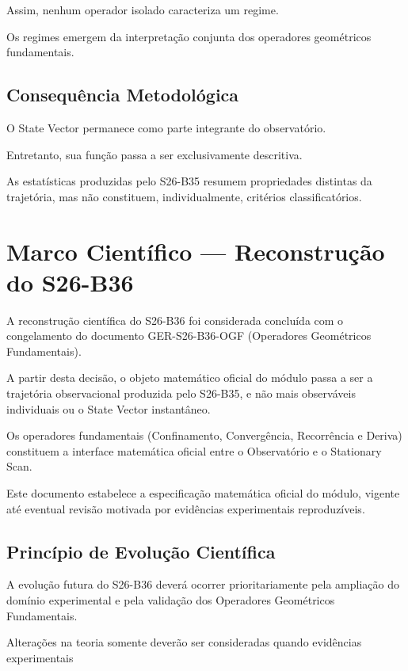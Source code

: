 \documentclass[11pt,a4paper]{article}
\begin{document}
Assim, nenhum operador isolado caracteriza um regime.

Os regimes emergem da interpretação conjunta dos operadores geométricos fundamentais.

\subsection{Consequência Metodológica}

O State Vector permanece como parte integrante do observatório.

Entretanto, sua função passa a ser exclusivamente descritiva.

As estatísticas produzidas pelo S26-B35 resumem propriedades distintas da trajetória, mas
não constituem, individualmente, critérios classificatórios.

\section{Marco Científico --- Reconstrução do S26-B36}

A reconstrução científica do S26-B36 foi considerada concluída com o congelamento do
documento GER-S26-B36-OGF (Operadores Geométricos Fundamentais).

A partir desta decisão, o objeto matemático oficial do módulo passa a ser a trajetória
observacional produzida pelo S26-B35, e não mais observáveis individuais ou o State
Vector instantâneo.

Os operadores fundamentais (Confinamento, Convergência, Recorrência e Deriva)
constituem a interface matemática oficial entre o Observatório e o Stationary Scan.

Este documento estabelece a especificação matemática oficial do módulo, vigente até
eventual revisão motivada por evidências experimentais reproduzíveis.

\subsection{Princípio de Evolução Científica}

A evolução futura do S26-B36 deverá ocorrer prioritariamente pela ampliação do domínio
experimental e pela validação dos Operadores Geométricos Fundamentais.

Alterações na teoria somente deverão ser consideradas quando evidências experimentais
\end{document}
